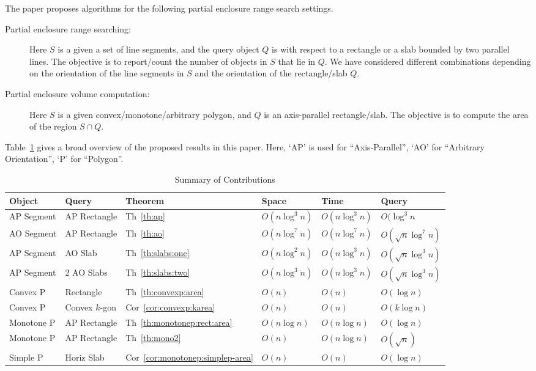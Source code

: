 {The paper proposes algorithms for the following partial enclosure range search settings.  
\begin{description}
\item[Partial enclosure range searching:] Here $S$ is a given a set of line segments, 
and the query object $Q$ is with respect to a rectangle or a slab bounded by two parallel lines. The objective is to report/count the number of objects in $S$ that lie in $Q$. We have considered different combinations depending on the orientation of the 
line segments in $S$ and the orientation of the rectangle/slab $Q$.
\item[Partial enclosure volume computation:] Here $S$ is a given convex/monotone/arbitrary polygon, and $Q$ is an axis-parallel rectangle/slab. The objective is to compute the area of the region $S\cap Q$. 
\end{description}

Table~\ref{tab:contributions} gives a broad overview of the proposed results in this paper. 
Here, `AP' is used for ``Axis-Parallel'', `AO' for ``Arbitrary Orientation'', `P' for ``Polygon''.

\begin{table}[t]
\caption{Summary of Contributions}
\label{tab:contributions}
\centering
\begin{tabular}{l l l l l l}
\hline \hline
Object & Query & Theorem & Space & Time & Query \\
\hline
AP Segment & AP Rectangle & Th~\ref{th:ap} & $O(n\log^3n)$ & $O(n\log^3n)$ & $O(\log^3n$ \\
AO Segment & AP Rectangle & Th~\ref{th:ao} & $O(n\log^7n)$ & $O(n\log^7n)$ & $O(\sqrt{n}\log^7n)$ \\
AP Segment & AO Slab & Th~\ref{th:slabs:one} & $O(n\log^2n)$ & $O(n\log^3n)$ & $O(\sqrt{n}\log^3n)$ \\
AP Segment & 2 AO Slabs & Th~\ref{th:slabs:two} & $O(n\log^3n)$ & $O(n\log^3n)$ & $O(\sqrt{n}\log^3n)$ \\
Convex P & Rectangle & Th~\ref{th:convexp:area} & $O(n)$ & $O(n)$ & $O(\log n)$ \\
Convex P & Convex $k$-gon & Cor~\ref{cor:convexp:karea} & $O(n)$ & $O(n)$ & $O(k \log n)$ \\
Monotone P & AP Rectangle & Th~\ref{th:monotonep:rect:area} & $O(n\log n)$ & $O(n\log n)$ & $O(\log n)$ \\
Monotone P & AP Rectangle & Th~\ref{th:mono2} & $O(n)$ & $O(n\log n)$ & $O(\sqrt{n})$ \\
Simple P & Horiz Slab & Cor~\ref{cor:monotonep:simplep-area} & $O(n)$ & $O(n)$ & $O(\log n)$ \\
\hline
\end{tabular}
\end{table}


}
